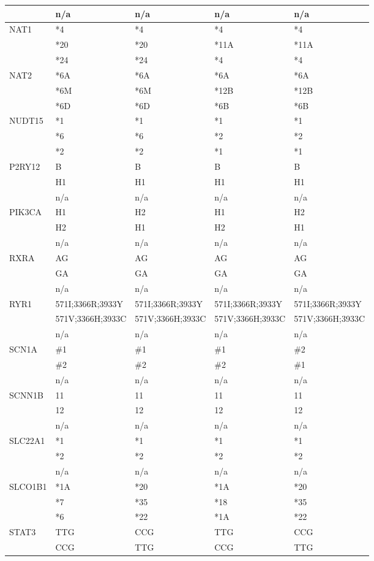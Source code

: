 \documentclass{report}
\begin{document}
\begin{tabularx}{\textwidth}{ X|XXXX }
& n/a & n/a & n/a & n/a \\
\midrule
 NAT1
& *4 & *4 & *4 & *4 \\
& *20 & *20 & *11A & *11A  \\
& *24 & *24 & *4 & *4 \\
\midrule
 NAT2
& *6A & *6A & *6A & *6A \\
& *6M & *6M & *12B & *12B  \\
& *6D & *6D & *6B & *6B \\
\midrule
 NUDT15
& *1 & *1 & *1 & *1 \\
& *6 & *6 & *2 & *2  \\
& *2 & *2 & *1 & *1 \\
\midrule
 P2RY12
& B & B & B & B \\
& H1 & H1 & H1 & H1  \\
& n/a & n/a & n/a & n/a \\
\midrule
 PIK3CA
& H1 & H2 & H1 & H2 \\
& H2 & H1 & H2 & H1  \\
& n/a & n/a & n/a & n/a \\
\midrule
 RXRA
& AG & AG & AG & AG \\
& GA & GA & GA & GA  \\
& n/a & n/a & n/a & n/a \\
\midrule
 RYR1
& 571I;3366R;3933Y & 571I;3366R;3933Y & 571I;3366R;3933Y & 571I;3366R;3933Y \\
& 571V;3366H;3933C & 571V;3366H;3933C & 571V;3366H;3933C & 571V;3366H;3933C  \\
& n/a & n/a & n/a & n/a \\
\midrule
 SCN1A
& \#1 & \#1 & \#1 & \#2 \\
& \#2 & \#2 & \#2 & \#1  \\
& n/a & n/a & n/a & n/a \\
\midrule
 SCNN1B
& 11 & 11 & 11 & 11 \\
& 12 & 12 & 12 & 12  \\
& n/a & n/a & n/a & n/a \\
\midrule
 SLC22A1
& *1 & *1 & *1 & *1 \\
& *2 & *2 & *2 & *2  \\
& n/a & n/a & n/a & n/a \\
\midrule
 SLCO1B1
& *1A & *20 & *1A & *20 \\
& *7 & *35 & *18 & *35  \\
& *6 & *22 & *1A & *22 \\
\midrule
 STAT3
& TTG & CCG & TTG & CCG \\
& CCG & TTG & CCG & TTG  \\

\end{tabularx}
\end{document}

